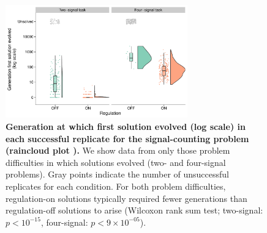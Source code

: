 
\begin{figure}[htbp]
    \centering
    \includegraphics[width=0.7\textwidth]{chapters/05-tag-based-genetic-regulation/media/signal-counting-solve-time-cloud.pdf}
    \caption{\small
    \textbf{Generation at which first solution evolved (log scale) in each successful replicate for the signal-counting problem (raincloud plot \citep{allen_raincloud_2019}).}
    We show data from only those problem difficulties in which solutions evolved (two- and four-signal problems).
    Gray points indicate the number of unsuccessful replicates for each condition.
    For both problem difficulties, regulation-on solutions typically required fewer generations than regulation-off solutions to arise (Wilcoxon rank sum test; two-signal: $p < 10^{-15}$, four-signal: $p < 9\times10^{-05}$). 
    }
    \label{chapter:tag-based-regulation:fig:signal-counting-solve-time}
\end{figure}

